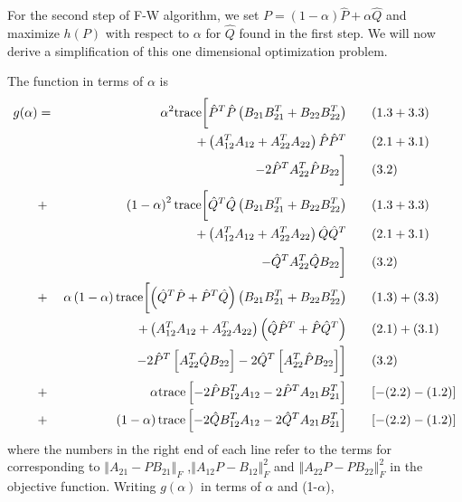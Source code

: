 \documentclass[12pt,oneside,final]{thesis}
\begin{document}
For the second step of F-W algorithm, we set  $P=(1-\alpha) \hat{P}+ \alpha\hat{Q}$ and maximize $h(P)$ with respect to $\alpha$ for $\hat{Q}$ found in the first step. We will now derive a simplification of this one dimensional optimization problem.

The function in terms of $\alpha$ is
\begin{align*}
g(\alpha) & = & \alpha^{2}  \tr\biggl[\hat{P}^{T}\hat{P}\left(B_{21}B_{21}^{T}+B_{22}B_{22}^{T}\right)  & \qquad(1.3+3.3) \\
 &  & +\left(A_{12}^{T}A_{12}+A_{22}^{T}A_{22}\right)\hat{P}\hat{P}^{T} & \qquad (2.1+3.1)\\
 &  &   -2\hat{P}^{T}A_{22}^{T}\hat{P}B_{22}\biggr] & \qquad (3.2)\\ %
 & +  & \left(1-\alpha\right)^{2}  \tr\biggl[\hat{Q}^{T}\hat{Q}\left(B_{21}B_{21}^{T}+B_{22}B_{22}^{T}\right) & \qquad (1.3+3.3) \\
 &  & +\left(A_{12}^{T}A_{12}+A_{22}^{T}A_{22}\right)\hat{Q}\hat{Q}^{T} &  \qquad (2.1+3.1)\\
 &  &   -\hat{Q}^{T}A_{22}^{T}\hat{Q}B_{22}\biggr] & \qquad (3.2)\\ %
 & + & \alpha\left(1-\alpha\right)  \tr \biggl[ \left(\hat{Q}^{T}\hat{P}+\hat{P}^{T}\hat{Q}\right)\left(B_{21}B_{21}^{T}+B_{22}B_{22}^{T}\right) & \qquad  (1.3)+(3.3) \\
 &  & +\left(A_{12}^{T}A_{12}+A_{22}^{T}A_{22}\right)\left(\hat{Q}\hat{P}^{T}+\hat{P}\hat{Q}^{T}\right)& \qquad (2.1)+(3.1)\\
 &  & -2\hat{P}^{T}\left[A_{22}^{T}\hat{Q}B_{22}\right]-2\hat{Q}^{T}\left[A_{22}^{T}\hat{P}B_{22}\right] \biggr] & \qquad (3.2)\\
 & + & \alpha  \tr\left[-2\hat{P}B_{12}^{T}A_{12}-2\hat{P}^{T}A_{21}B_{21}^{T}\right] &\qquad [-(2.2)-(1.2)]\\
 & + & \left(1-\alpha\right)  \tr\left[-2\hat{Q}B_{12}^{T}A_{12}-2\hat{Q}^{T}A_{21}B_{21}^{T}\right] &  \qquad [-(2.2)-(1.2)]
\end{align*}
where the  numbers in the right end of each line refer to the
terms for corresponding to $\left\Vert A_{21}-PB_{21}\right\Vert _{F}$
,$\left\Vert A_{12}P-B_{12}\right\Vert _{F}^2$ and $\left\Vert A_{22}P-PB_{22}\right\Vert _{F}^2$
in the objective function. Writing $g\left(\alpha\right)$ in terms
of $\alpha$ and (1-$\alpha$),
\end{document}

